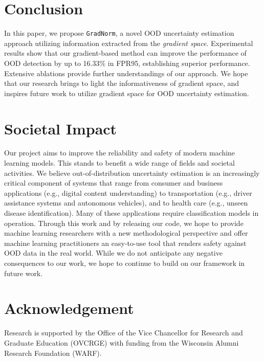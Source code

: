 \documentclass{article}
\begin{document}
\vspace{-0.3cm}
\section{Conclusion}
\vspace{-0.2cm}
\label{sec:conclusion}
In this paper, we propose \texttt{GradNorm}, a novel OOD uncertainty estimation approach utilizing information extracted from the \emph{gradient space}. Experimental results show that our gradient-based method can improve the performance of OOD detection by up to  {16.33}\% in FPR95, establishing superior performance.
Extensive ablations provide further understandings of our approach. 
We hope that our research brings to light the informativeness of gradient space, and inspires future work to utilize gradient space for OOD uncertainty estimation.


\vspace{-0.2cm}
\section{Societal Impact}
\label{sec:broad}
\vspace{-0.3cm}
Our project aims to improve the reliability and safety of modern machine learning models.
This stands to benefit a wide range of fields and societal activities. We believe out-of-distribution uncertainty estimation is an increasingly critical component of systems that range from consumer and business applications (e.g., digital content understanding) to transportation (e.g., driver assistance systems and autonomous vehicles), and to health care (e.g., unseen disease identification). Many of these applications require classification models in operation.\@
Through this work and by releasing our code, we hope to provide machine learning researchers with a new methodological perspective and offer machine learning practitioners an easy-to-use tool that renders safety against OOD data in the real world. While we do not anticipate any negative consequences to our work, we hope to continue to build on our framework in future work. 
\vspace{-0.2cm}
\section*{Acknowledgement}
\vspace{-0.3cm}
 Research is supported by the Office of the Vice Chancellor for Research and Graduate Education (OVCRGE) with funding from the Wisconsin Alumni Research Foundation (WARF).
\end{document}
